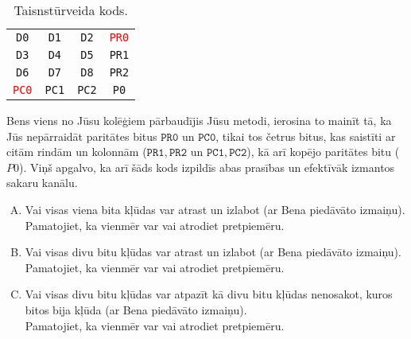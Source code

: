 \documentclass[a4paper]{article}
\begin{document}
\begin{table}[h]
\begin{center}
\begin{tabular}{cccc}
{\tt D0} & {\tt D1} & {\tt D2} & \textcolor{red}{\tt PR0} \\
{\tt D3} & {\tt D4} & {\tt D5} & {\tt PR1} \\
{\tt D6} & {\tt D7} & {\tt D8} & {\tt PR2} \\
\textcolor{red}{\tt PC0} & {\tt PC1} & {\tt PC2} & {\tt P0} \\
\end{tabular}
\caption{\label{tab:rectangular} Taisnstūrveida kods.}
\end{center}
\end{table}

Bens \textendash{} viens no Jūsu kolēģiem \textendash{} pārbaudījis Jūsu
metodi, ierosina to mainīt tā, ka Jūs nepārraidāt paritātes bitus
$\mathtt{PR0}$ un $\mathtt{PC0}$, tikai tos četrus bitus, kas
saistīti ar citām rindām un kolonnām 
($\mathtt{PR1},\mathtt{PR2}$ un $\mathtt{PC1},\mathtt{PC2}$), 
kā arī kopējo paritātes bitu ($P0$).
Viņš apgalvo, ka arī šāds kods izpildīs abas prasības 
un efektīvāk izmantos sakaru kanālu.
\begin{enumerate}[(A)]
\item Vai visas viena bita kļūdas var atrast un izlabot (ar Bena piedāvāto izmaiņu).\\ 
Pamatojiet, ka vienmēr var vai atrodiet pretpiemēru. 
\item Vai visas divu bitu kļūdas var atrast un izlabot (ar Bena piedāvāto izmaiņu).\\
Pamatojiet, ka vienmēr var vai atrodiet pretpiemēru. 
\item Vai visas divu bitu kļūdas var atpazīt kā divu bitu kļūdas \textendash{} 
nenosakot, kuros bitos bija kļūda (ar Bena piedāvāto izmaiņu).\\
Pamatojiet, ka vienmēr var vai atrodiet pretpiemēru. 
\end{enumerate}
\end{document}
